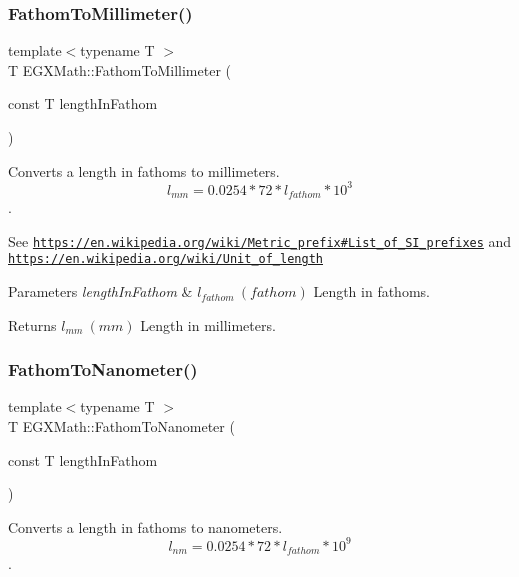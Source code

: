\subsubsection{\texorpdfstring{Fathom\+To\+Millimeter()}{FathomToMillimeter()}}
{\footnotesize\ttfamily template$<$typename T $>$ \\
T E\+G\+X\+Math\+::\+Fathom\+To\+Millimeter (\begin{DoxyParamCaption}\item[{const T}]{length\+In\+Fathom }\end{DoxyParamCaption})}



Converts a length in fathoms to millimeters. \[ l_{mm}=0.0254 * 72 * l_{fathom} * 10^{3} \]. 

See \href{https://en.wikipedia.org/wiki/Metric_prefix#List_of_SI_prefixes}{\tt https\+://en.\+wikipedia.\+org/wiki/\+Metric\+\_\+prefix\#\+List\+\_\+of\+\_\+\+S\+I\+\_\+prefixes} and \href{https://en.wikipedia.org/wiki/Unit_of_length}{\tt https\+://en.\+wikipedia.\+org/wiki/\+Unit\+\_\+of\+\_\+length} 
\begin{DoxyParams}{Parameters}
{\em length\+In\+Fathom} & $ l_{fathom}\ (fathom)$ Length in fathoms. \\
\hline
\end{DoxyParams}
\begin{DoxyReturn}{Returns}
$ l_{mm}\ (mm)$ Length in millimeters. 
\end{DoxyReturn}
\mbox{\label{group___e_g_x_math-_conversions-_length_conversions-_imperial-_fathom-_s_i_gad31bafe9815ccaf4f06f429e3eb9c242}} 
\subsubsection{\texorpdfstring{Fathom\+To\+Nanometer()}{FathomToNanometer()}}
{\footnotesize\ttfamily template$<$typename T $>$ \\
T E\+G\+X\+Math\+::\+Fathom\+To\+Nanometer (\begin{DoxyParamCaption}\item[{const T}]{length\+In\+Fathom }\end{DoxyParamCaption})}



Converts a length in fathoms to nanometers. \[ l_{nm}=0.0254 * 72 * l_{fathom} * 10^{9} \]. 

